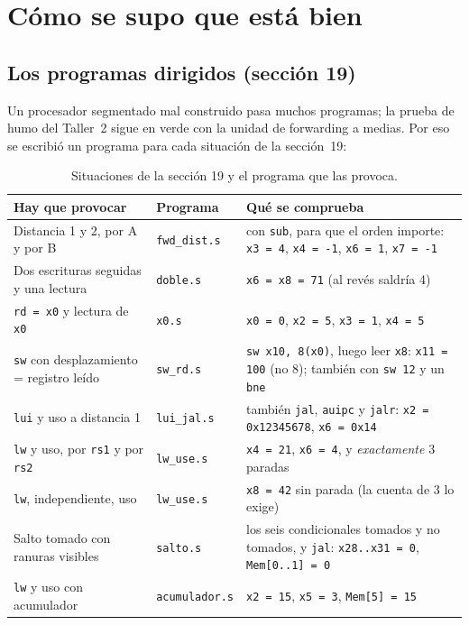 \documentclass[11pt,letterpaper]{article}
\newcommand{\cod}[1]{\texttt{#1}}
\begin{document}
\section{C\'omo se supo que est\'a bien}

\subsection{Los programas dirigidos (secci\'on 19)}
Un procesador segmentado mal construido pasa muchos programas; la prueba de humo del Taller~2 sigue en
verde con la unidad de forwarding a medias. Por eso se escribi\'o un programa para cada situaci\'on
de la secci\'on~19:

\begin{table}[!htbp]
\centering\small
\begin{tabularx}{\textwidth}{@{}X l X@{}}
\toprule
\textbf{Hay que provocar} & \textbf{Programa} & \textbf{Qu\'e se comprueba} \\
\midrule
Distancia 1 y 2, por A y por B & \cod{fwd\_dist.s} & con \cod{sub}, para que el orden importe:
  \cod{x3 = 4}, \cod{x4 = -1}, \cod{x6 = 1}, \cod{x7 = -1} \\
Dos escrituras seguidas y una lectura & \cod{doble.s} & \cod{x6 = x8 = 71} (al rev\'es saldr\'ia 4) \\
\cod{rd = x0} y lectura de \cod{x0} & \cod{x0.s} & \cod{x0 = 0}, \cod{x2 = 5}, \cod{x3 = 1}, \cod{x4 = 5} \\
\cod{sw} con desplazamiento = registro le\'ido & \cod{sw\_rd.s} & \cod{sw x10, 8(x0)}, luego leer \cod{x8}:
  \cod{x11 = 100} (no 8); tambi\'en con \cod{sw 12} y un \cod{bne} \\
\cod{lui} y uso a distancia 1 & \cod{lui\_jal.s} & tambi\'en \cod{jal}, \cod{auipc} y \cod{jalr}:
  \cod{x2 = 0x12345678}, \cod{x6 = 0x14} \\
\cod{lw} y uso, por \cod{rs1} y por \cod{rs2} & \cod{lw\_use.s} & \cod{x4 = 21}, \cod{x6 = 4}, y
  \emph{exactamente} 3 paradas \\
\cod{lw}, independiente, uso & \cod{lw\_use.s} & \cod{x8 = 42} sin parada (la cuenta de 3 lo exige) \\
Salto tomado con ranuras visibles & \cod{salto.s} & los seis condicionales tomados y no tomados, y
  \cod{jal}: \cod{x28..x31 = 0}, \cod{Mem[0..1] = 0} \\
\cod{lw} y uso con acumulador & \cod{acumulador.s} & \cod{x2 = 15}, \cod{x5 = 3}, \cod{Mem[5] = 15} \\
\bottomrule
\end{tabularx}
\caption{Situaciones de la secci\'on 19 y el programa que las provoca.}
\end{table}
\end{document}
